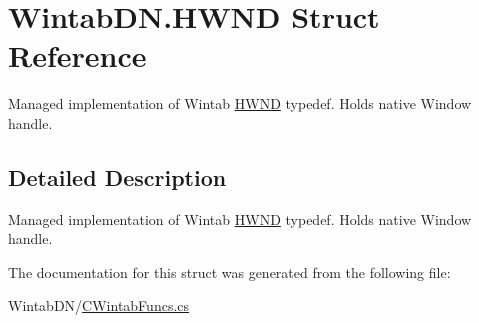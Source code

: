 \hypertarget{struct_wintab_d_n_1_1_h_w_n_d}{}\section{Wintab\+D\+N.\+H\+W\+ND Struct Reference}
\label{struct_wintab_d_n_1_1_h_w_n_d}


Managed implementation of Wintab \mbox{\hyperlink{struct_wintab_d_n_1_1_h_w_n_d}{H\+W\+ND}} typedef. Holds native Window handle.  




\subsection{Detailed Description}
Managed implementation of Wintab \mbox{\hyperlink{struct_wintab_d_n_1_1_h_w_n_d}{H\+W\+ND}} typedef. Holds native Window handle. 



The documentation for this struct was generated from the following file\+:\begin{DoxyCompactItemize}
\item 
Wintab\+D\+N/\mbox{\hyperlink{_c_wintab_funcs_8cs}{C\+Wintab\+Funcs.\+cs}}\end{DoxyCompactItemize}

